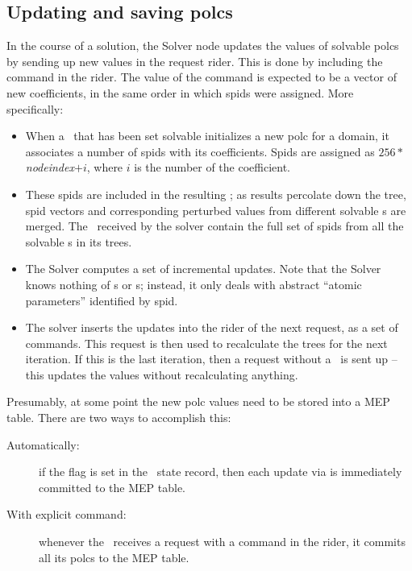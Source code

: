 \subsection{Updating and saving polcs}    

  In the course of a solution, the Solver node updates the values of solvable
  polcs by sending up new values in the request rider. This is done by
  including the  command in the rider. The value of the
  command is expected to be a vector of new coefficients, in the same order in
  which spids were assigned. More specifically:

  \begin{itemize}
  
  \item When a \Parm\ that has been set solvable initializes a new polc for a
  domain, it associates a number of spids with its coefficients. Spids are
  assigned as $256*${\em nodeindex}$+i$, where $i$ is the number of the
  coefficient.
  
  \item These spids are included in the resulting \Vells; as results percolate
  down the tree, spid vectors and corresponding perturbed values from different
  solvable \Parm{}s are merged. The \Vells\ received by the solver contain the
  full set of spids from all the solvable \Parm{}s in its trees.

  \item The Solver computes a set of incremental updates. Note that the Solver
  knows nothing of \Polc{}s or \Parm{}s; instead, it only deals with abstract
  ``atomic parameters'' identified by spid.

  \item The solver inserts the updates into the rider of the next request, as
  a set of  commands. This request is then used to recalculate
  the trees for the next iteration. If this is the last iteration, then a
  request without a \Cells\ is sent up -- this updates the values without
  recalculating anything.
  
  \end{itemize}
  
  Presumably, at some point the new polc values need to be stored into a MEP
  table. There are two ways to accomplish this:

  \begin{description}
  
  \item[Automatically:] if the  flag is set in the \Parm\ state
  record, then each update via  is immediately committed to the
  MEP table.

  \item[With explicit command:] whenever the \Parm\ receives a request with a
   command in the rider, it commits all its polcs to the MEP
  table.

  \end{description}
  
